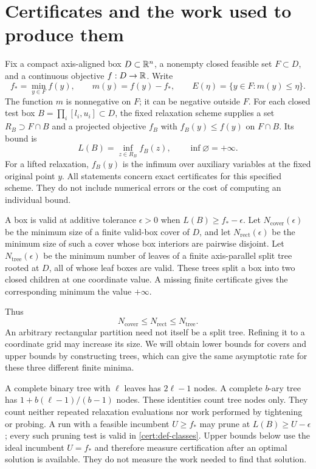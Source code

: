 \section{Certificates and the work used to produce them}
\label{sec:certificates}

Fix a compact axis-aligned box $D\subset\mathbb{R}^n$, a nonempty closed feasible
set $F\subset D$, and a continuous objective $f:D\to\mathbb{R}$. Write
\[
 f_* = \min_{y\in F}f(y),\qquad m(y)=f(y)-f_*,\qquad
 E(\eta)=\{y\in F:m(y)\leq\eta\}.
\]
The function $m$ is nonnegative on $F$; it can be negative outside $F$.
For each closed test box $B=\prod_i[l_i,u_i]\subset D$, the fixed
relaxation scheme supplies a set $R_B\supset F\cap B$ and a projected
objective $f_B$ with $f_B(y)\leq f(y)$ on $F\cap B$. Its bound is
\[
 L(B)=\inf_{z\in R_B}f_B(z),\qquad \inf\varnothing=+\infty.
\]
For a lifted relaxation, $f_B(y)$ is the infimum over auxiliary variables
at the fixed original point $y$. All statements concern exact certificates
for this specified scheme. They do not include numerical errors or the cost
of computing an individual bound.

\begin{definition}
\label{cert:def-classes}
A box is valid at additive tolerance $\epsilon>0$ when
$L(B)\geq f_*-\epsilon$. Let $N_{\mathrm{cover}}(\epsilon)$ be the minimum
size of a finite valid-box cover of $D$, and let
$N_{\mathrm{rect}}(\epsilon)$ be the minimum size of such a cover whose
box interiors are pairwise disjoint. Let $N_{\mathrm{tree}}(\epsilon)$ be
the minimum number of leaves of a finite axis-parallel split tree rooted
at $D$, all of whose leaf boxes are valid. These trees split a box into two
closed children at one coordinate value. A missing finite certificate
gives the corresponding minimum the value $+\infty$.
\end{definition}

Thus
\begin{equation}\label{cert:eq-benchmarks}
 N_{\mathrm{cover}}\leq N_{\mathrm{rect}}\leq N_{\mathrm{tree}}.
\end{equation}
An arbitrary rectangular partition need not itself be a split tree.
Refining it to a coordinate grid may increase its size. We will obtain
lower bounds for covers and upper bounds by constructing trees, which can
give the same asymptotic rate for these three different finite minima.

A complete binary tree with $\ell$ leaves has $2\ell-1$ nodes. A complete
$b$-ary tree has $1+b(\ell-1)/(b-1)$ nodes. These identities count tree
nodes only. They count neither repeated relaxation evaluations nor work
performed by tightening or probing. A run with a feasible incumbent
$U\geq f_*$ may prune at $L(B)\geq U-\epsilon$; every such pruning test is
valid in \cref{cert:def-classes}. Upper bounds below use the ideal incumbent
$U=f_*$ and therefore measure certification after an optimal solution is
available. They do not measure the work needed to find that solution.

